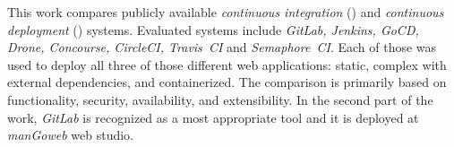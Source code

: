 This work compares publicly available \textit{continuous integration} (\CI) and \textit{continuous deployment} (\CD) systems. Evaluated systems include \textit{GitLab, Jenkins, GoCD, Drone, Concourse, CircleCI, Travis~CI} and \textit{Semaphore~CI}. Each of those was used to deploy all three of those different web applications: static, complex with external dependencies, and containerized. The comparison is primarily based on functionality, security, availability, and extensibility. In the second part of the work, \textit{GitLab} is recognized as a most appropriate tool and it is deployed at \textit{manGoweb} web studio.
